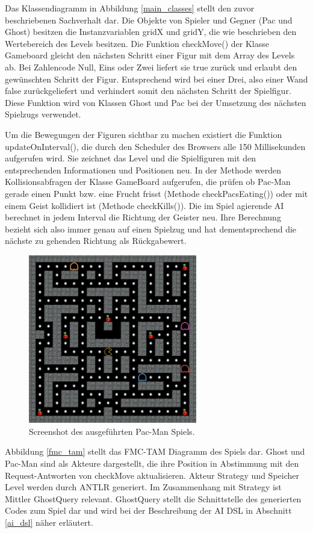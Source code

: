 \documentclass[conference]{IEEEtran}
\begin{document}
Das Klassendiagramm in Abbildung \ref{main_classes} stellt den zuvor beschriebenen Sachverhalt dar. Die Objekte von Spieler und Gegner (Pac und Ghost) besitzen die Instanzvariablen gridX und gridY, die wie beschrieben den Wertebereich des Levels besitzen. Die Funktion checkMove() der Klasse Gameboard gleicht den nächsten Schritt einer Figur mit dem Array des Levels ab. Bei Zahlencode Null, Eins oder Zwei liefert sie true zurück und erlaubt den gewünschten Schritt der Figur. Entsprechend wird bei einer Drei, also einer Wand false zurückgeliefert und verhindert somit den nächsten Schritt der Spielfigur. Diese Funktion wird von Klassen Ghost und Pac bei der Umsetzung des nächsten Spielzugs verwendet.

Um die Bewegungen der Figuren sichtbar zu machen existiert die Funktion updateOnInterval(), die durch den Scheduler des Browsers  alle 150 Millisekunden aufgerufen wird. Sie zeichnet das Level und die Spielfiguren mit den entsprechenden Informationen und Positionen neu. In der Methode werden Kollisionsabfragen der Klasse GameBoard aufgerufen, die prüfen ob Pac-Man gerade einen Punkt bzw. eine Frucht frisst (Methode checkPacsEating()) oder mit einem Geist kollidiert ist (Methode checkKills()). Die im Spiel agierende AI berechnet in jedem Interval die Richtung der Geister neu. Ihre Berechnung bezieht sich also immer genau auf einen Spielzug und hat dementsprechend die nächste zu gehenden Richtung als Rückgabewert.

\begin{figure}[!t]
\centering
\includegraphics[width=2.9in]{screenshot.png}

\caption{Screenshot des ausgeführten Pac-Man Spiels.}
\label{pac_screen}
\end{figure}

Abbildung \ref{fmc_tam} stellt das FMC-TAM Diagramm des Spiels dar. Ghost und Pac-Man sind als Akteure dargestellt, die ihre Position in Abstimmung mit den Request-Antworten von checkMove aktualisieren. Akteur Strategy und Speicher Level werden durch ANTLR generiert. Im Zusammenhang mit Strategy ist Mittler GhostQuery relevant. GhostQuery stellt die Schnittstelle des generierten Codes zum Spiel dar und wird bei der Beschreibung der AI DSL in Abschnitt \ref{ai_dsl} näher erläutert.
\end{document}
